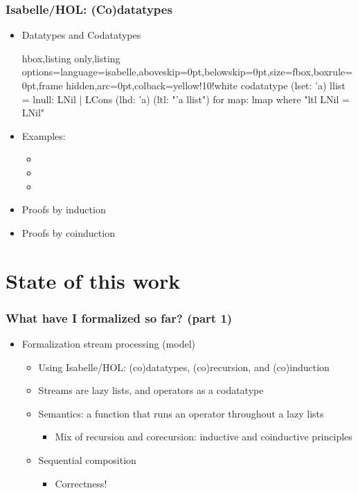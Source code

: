 \documentclass[aspectratio=169,10pt]{beamer}
\begin{document}
\begin{frame}[fragile]
  \frametitle{Isabelle/HOL: (Co)datatypes}
  \begin{itemize}
    \item Datatypes and Codatatypes
\vspace*{-1ex}
          \begin{tcblisting}{hbox,listing only,listing options={language=isabelle,aboveskip=0pt,belowskip=0pt},size=fbox,boxrule=0pt,frame hidden,arc=0pt,colback=yellow!10!white}
codatatype (lset: 'a) llist = lnull: LNil | LCons (lhd: 'a) (ltl: "'a llist")
  for map: lmap where "ltl LNil = LNil"
          \end{tcblisting}
\vspace*{-1ex}
    \item Examples:
          \begin{itemize}
            \item {}
            \item {}
            \item {}
          \end{itemize}
\vspace*{-1ex}
    \item Proofs by induction
    \item Proofs by coinduction
  \end{itemize}
\end{frame}

\section{State of this work}

\begin{frame}[fragile]
  \frametitle{What have I formalized so far? (part 1)}
  \begin{itemize}
    \item Formalization stream processing (model)
          \begin{itemize}
            \item Using Isabelle/HOL: (co)datatypes, (co)recursion, and (co)induction
            \item Streams are lazy lists, and operators as a codatatype
            \item Semantics: a  function that runs an operator throughout a lazy lists
                  \begin{itemize}
                    \item Mix of recursion and corecursion: inductive and coinductive principles
                  \end{itemize}
            \item Sequential composition
                  \begin{itemize}
                    \item Correctness!
                  \end{itemize}
          \end{itemize}
  \end{itemize}
\end{frame}
\end{document}
